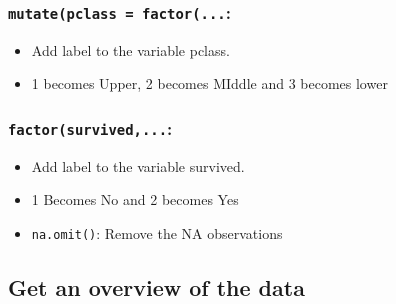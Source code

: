 \documentclass[10pt,]{article}
\newenvironment{Shaded}{\begin{snugshade}}{\end{snugshade}}
\newcommand{\KeywordTok}[1]{\textcolor[rgb]{0.13,0.29,0.53}{\textbf{#1}}}
\newcommand{\DataTypeTok}[1]{\textcolor[rgb]{0.13,0.29,0.53}{#1}}
\newcommand{\DecValTok}[1]{\textcolor[rgb]{0.00,0.00,0.81}{#1}}
\newcommand{\StringTok}[1]{\textcolor[rgb]{0.31,0.60,0.02}{#1}}
\newcommand{\OperatorTok}[1]{\textcolor[rgb]{0.81,0.36,0.00}{\textbf{#1}}}
\newcommand{\NormalTok}[1]{#1}
\providecommand{\tightlist}{%
  \setlength{\itemsep}{0pt}\setlength{\parskip}{0pt}}
\begin{document}
\begin{Shaded}
\end{Shaded}

\subsubsection{\texorpdfstring{\texttt{mutate(pclass\ =\ factor(...}:}{mutate(pclass = factor(...:}}\label{mutatepclass-factor...}

\begin{itemize}
\tightlist
\item
  Add label to the variable pclass.
\item
  1 becomes Upper, 2 becomes MIddle and 3 becomes lower
\end{itemize}

\subsubsection{\texorpdfstring{\texttt{factor(survived,...}:}{factor(survived,...:}}\label{factorsurvived...}

\begin{itemize}
\item
  Add label to the variable survived.
\item
  1 Becomes No and 2 becomes Yes
\item
  \texttt{na.omit()}: Remove the NA observations
\end{itemize}

\subsection{Get an overview of the
data}\label{get-an-overview-of-the-data}
\end{document}
